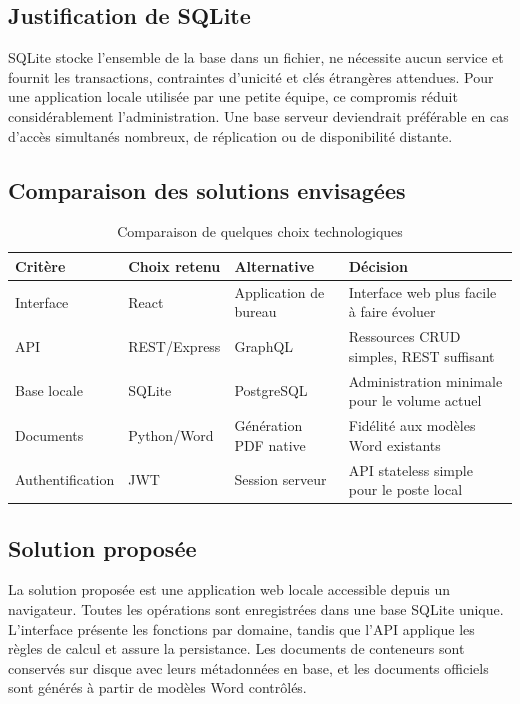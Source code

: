 \documentclass[12pt,a4paper,oneside]{report}
\begin{document}
\subsection{Justification de SQLite}
SQLite stocke l'ensemble de la base dans un fichier, ne nécessite aucun service et fournit les transactions, contraintes d'unicité et clés étrangères attendues. Pour une application locale utilisée par une petite équipe, ce compromis réduit considérablement l'administration. Une base serveur deviendrait préférable en cas d'accès simultanés nombreux, de réplication ou de disponibilité distante.

\subsection{Comparaison des solutions envisagées}
\begin{table}[H]\centering
\caption{Comparaison de quelques choix technologiques}
\begin{tabularx}{\textwidth}{p{3cm}Y Y Y}
\toprule \textbf{Critère} & \textbf{Choix retenu} & \textbf{Alternative} & \textbf{Décision}\\ \midrule
Interface & React & Application de bureau & Interface web plus facile à faire évoluer\\
API & REST/Express & GraphQL & Ressources CRUD simples, REST suffisant\\
Base locale & SQLite & PostgreSQL & Administration minimale pour le volume actuel\\
Documents & Python/Word & Génération PDF native & Fidélité aux modèles Word existants\\
Authentification & JWT & Session serveur & API stateless simple pour le poste local\\
\bottomrule
\end{tabularx}
\end{table}

\subsection{Solution proposée}
La solution proposée est une application web locale accessible depuis un navigateur. Toutes les opérations sont enregistrées dans une base SQLite unique. L'interface présente les fonctions par domaine, tandis que l'API applique les règles de calcul et assure la persistance. Les documents de conteneurs sont conservés sur disque avec leurs métadonnées en base, et les documents officiels sont générés à partir de modèles Word contrôlés.
\end{document}
